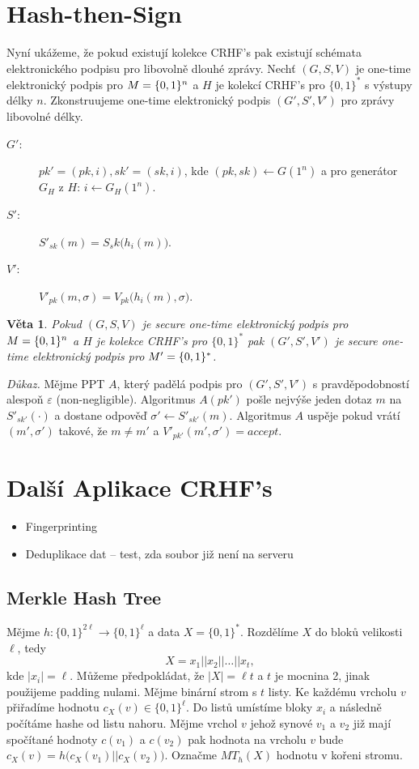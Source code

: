 \documentclass{article}
\newtheorem{theorem}{Věta}
\begin{document}
\section{Hash-then-Sign}
Nyní ukážeme, že pokud existují kolekce CRHF's pak existují schémata elektronického podpisu pro libovolně dlouhé zprávy.
Nechť $(G,S,V)$ je one-time elektronický podpis pro ${\sc M} = \{0,1\}^n$ a $H$ je kolekcí CRHF's pro $\{0,1\}^*$ s výstupy délky $n$.
Zkonstruujeme one-time elektronický podpis $(G',S',V')$ pro zprávy libovolné délky.
\begin{description}
\item[$G'$:] $pk'=(pk,i), sk'=(sk,i)$, kde $(pk,sk) \leftarrow G(1^n)$ a pro generátor $G_H$ z $H$: $i \leftarrow G_H(1^n)$.
\item[$S'$:] $S'_{sk}(m) = S_sk\bigl(h_i(m)\bigr)$.
\item[$V'$:] $V'_{pk}(m,\sigma) = V_{pk}\bigl(h_i(m),\sigma\bigr)$.
\end{description}

\begin{theorem}
Pokud $(G,S,V)$ je secure one-time elektronický podpis pro ${\sc M} = \{0,1\}^n$ a $H$ je kolekce CRHF's pro $\{0,1\}^*$ pak $(G',S',V')$ je secure one-time elektronický podpis pro ${\sc M}' = \{0,1\}^*$.
\end{theorem}
\noindent\textit{Důkaz.}
Mějme PPT $A$, který padělá podpis pro $(G',S',V')$ s pravděpodobností alespoň $\varepsilon$ (non-negligible).
Algoritmus $A(pk')$ pošle nejvýše jeden dotaz $m$ na $S'_{sk'}(\cdot)$ a dostane odpověď $\sigma' \leftarrow S'_{sk'}(m)$.
Algoritmus $A$ uspěje pokud vrátí $(m',\sigma')$ takové, že $m \neq m'$ a $V'_{pk'}(m',\sigma') = \textit{accept}$.

\section{Další Aplikace CRHF's}
\begin{itemize}
\item Fingerprinting
\item Deduplikace dat -- test, zda soubor již není na serveru
\end{itemize}
\subsection{Merkle Hash Tree}
Mějme $h: \{0,1\}^{2\ell} \to \{0,1\}^\ell$ a data $X = \{0,1\}^*$. 
Rozdělíme $X$ do bloků velikosti $\ell$, tedy
\[
X = x_1 || x_2 || \dots || x_t,
\]
kde $|x_i| = \ell$.
Můžeme předpokládat, že $|X| = \ell t$ a $t$ je mocnina 2, jinak použijeme padding nulami.
Mějme binární strom s $t$ listy.
Ke každému vrcholu $v$ přiřadíme hodnotu $c_X(v) \in \{0,1\}^\ell$.
Do listů umístíme bloky $x_i$ a následně počítáme hashe od listu nahoru.
Mějme vrchol $v$ jehož synové $v_1$ a $v_2$ již mají spočítané hodnoty $c(v_1)$ a $c(v_2)$ pak hodnota na vrcholu $v$ bude $c_X(v) = h\bigl(c_X(v_1) || c_X(v_2)\bigr)$. 
Označme $MT_h(X)$ hodnotu v kořeni stromu.
\end{document}
